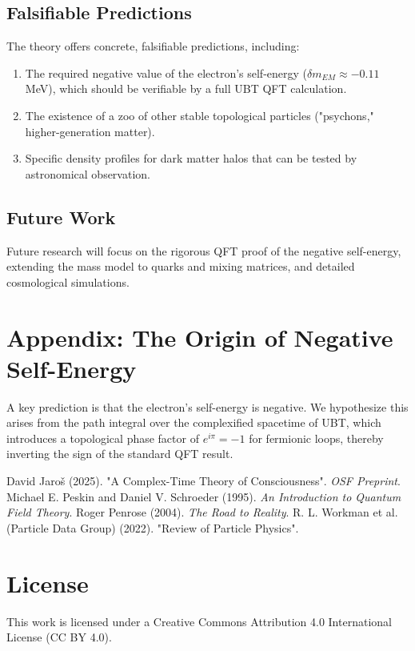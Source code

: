 \documentclass[12pt, a4paper]{article}
\begin{document}
\subsection{Falsifiable Predictions}
The theory offers concrete, falsifiable predictions, including:
\begin{enumerate}
    \item The required negative value of the electron's self-energy (\( \delta m_{EM} \approx -0.11 \) MeV), which should be verifiable by a full UBT QFT calculation.
    \item The existence of a zoo of other stable topological particles ("psychons," higher-generation matter).
    \item Specific density profiles for dark matter halos that can be tested by astronomical observation.
\end{enumerate}

\subsection{Future Work}
Future research will focus on the rigorous QFT proof of the negative self-energy, extending the mass model to quarks and mixing matrices, and detailed cosmological simulations.

\appendix
\section{Appendix: The Origin of Negative Self-Energy}
A key prediction is that the electron's self-energy is negative. We hypothesize this arises from the path integral over the complexified spacetime of UBT, which introduces a topological phase factor of \( e^{i\pi} = -1 \) for fermionic loops, thereby inverting the sign of the standard QFT result.

\begin{thebibliography}{9}
     David Jaroš (2025). "A Complex-Time Theory of Consciousness". \textit{OSF Preprint}.
     Michael E. Peskin and Daniel V. Schroeder (1995). \textit{An Introduction to Quantum Field Theory}.
     Roger Penrose (2004). \textit{The Road to Reality}.
     R. L. Workman et al. (Particle Data Group) (2022). "Review of Particle Physics".
\end{thebibliography}

\section*{License}
This work is licensed under a Creative Commons Attribution 4.0 International License (CC BY 4.0).
\end{document}
